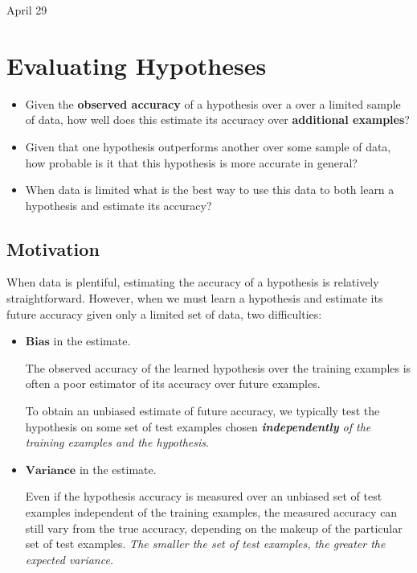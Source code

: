 \univlogo

{\Huge April 29}\vspace{5mm}

\hypertarget{evaluating-hypotheses}{%
\section{Evaluating Hypotheses}\label{evaluating-hypotheses}}

\begin{itemize}
\item
  Given the \textbf{observed accuracy} of a hypothesis over a over a
  limited sample of data, how well does this estimate its accuracy over
  \textbf{additional examples}?
\item
  Given that one hypothesis outperforms another over some sample of
  data, how probable is it that this hypothesis is more accurate in
  general?
\item
  When data is limited what is the best way to use this data to both
  learn a hypothesis and estimate its accuracy?
\end{itemize}

\hypertarget{motivation}{%
\subsection{Motivation}\label{motivation}}

When data is plentiful, estimating the accuracy of a hypothesis is
relatively straightforward. However, when we must learn a hypothesis and
estimate its future accuracy given only a limited set of data, two
difficulties:

\begin{itemize}
\item
  \(\mathbf{Bias}\) in the estimate.

  The observed accuracy of the learned hypothesis over the training
  examples is often a poor estimator of its accuracy over future
  examples.

  To obtain an unbiased estimate of future accuracy, we typically test
  the hypothesis on some set of test examples chosen
  \emph{\textbf{independently} of the training examples and the
  hypothesis}.
\item
  \(\mathbf{Variance}\) in the estimate.

  Even if the hypothesis accuracy is measured over an unbiased set of
  test examples independent of the training examples, the measured
  accuracy can still vary from the true accuracy, depending on the
  makeup of the particular set of test examples. \emph{The smaller the
  set of test examples, the greater the expected variance.}
\end{itemize}


